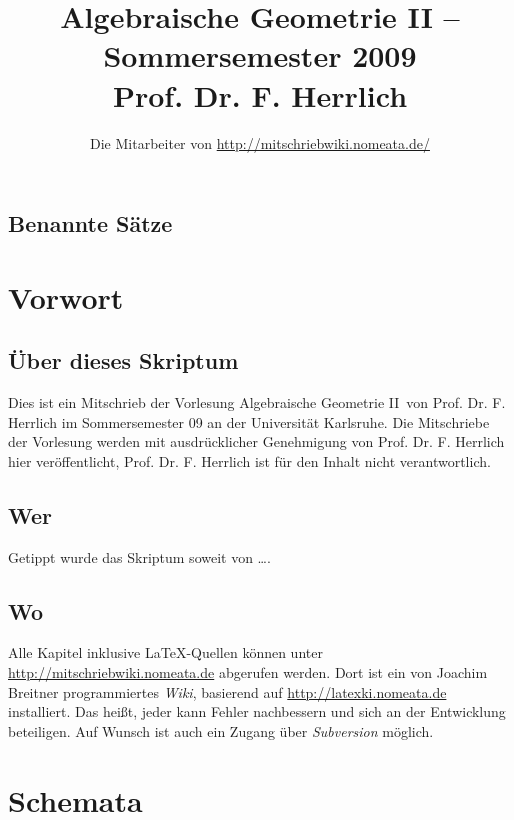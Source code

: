 \documentclass[a4paper,oneside]{scrbook}
\title{Algebraische Geometrie II -- Sommersemester 2009\\ Prof. Dr. F. Herrlich}
\author{Die Mitarbeiter von \url{http://mitschriebwiki.nomeata.de/}}
\theoremstyle{break}
\theoremstyle{nonumberbreak}
\theoremstyle{nonumberplain}
\theoremstyle{break}
\begin{document}
\maketitle

\setlength\parskip{0.6pt}
\tableofcontents

\section*{Benannte Sätze}


\setlength\parskip{\smallskipamount}

\chapter{Vorwort}
\setcounter{secnumdepth}{2}
\section*{Über dieses Skriptum}
Dies ist ein Mitschrieb der Vorlesung \glqq Algebraische Geometrie II\grqq\ von Prof. Dr. F. Herrlich im
Sommersemester 09 an der Universität Karlsruhe.
Die Mitschriebe der Vorlesung werden mit ausdrücklicher Genehmigung von Prof. Dr. F. Herrlich hier veröffentlicht,
Prof. Dr. F. Herrlich ist für  den Inhalt nicht verantwortlich.
\section*{Wer}
Getippt wurde das Skriptum soweit von \dots.

\section*{Wo}
Alle Kapitel inklusive \LaTeX-Quellen können unter \url{http://mitschriebwiki.nomeata.de} abgerufen werden.
Dort ist ein von Joachim Breitner programmiertes \emph{Wiki}, basierend auf \url{http://latexki.nomeata.de} installiert. 
Das heißt, jeder kann Fehler nachbessern und sich an der Entwicklung
beteiligen. Auf Wunsch ist auch ein Zugang über \emph{Subversion} möglich.

\chapter{Schemata}
\end{document}
